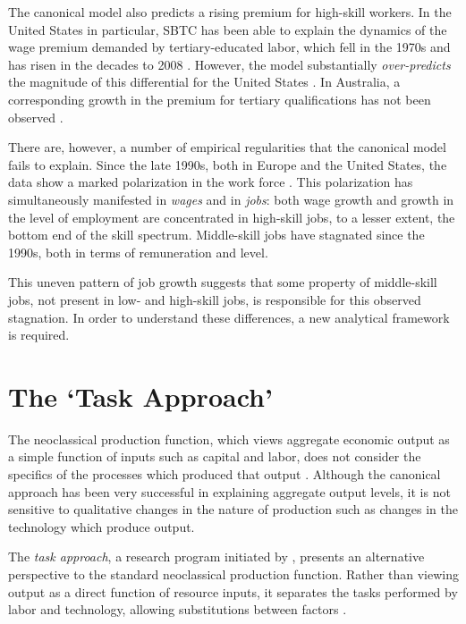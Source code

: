 The canonical model also predicts a rising premium for high-skill workers. In the United States in particular, SBTC has been able to explain the dynamics of the wage premium demanded by tertiary-educated labor, which fell in the 1970s and has risen in the decades to 2008 \citep{Acemoglu2011}. However, the model substantially \emph{over-predicts} the magnitude of this differential for the United States \citep{Autor2008}. In Australia, a corresponding growth in the premium for tertiary qualifications has not been observed \citep{Coelli2009}.

There are, however, a number of empirical regularities that the canonical model fails to explain. Since the late 1990s, both in Europe and the United States, the data show a marked polarization in the work force \citep{Goos2007, Autor2006}. This polarization has simultaneously manifested in \emph{wages} and in \emph{jobs}: both wage growth and growth in the level of employment are concentrated in high-skill jobs, to a lesser extent, the bottom end of the skill spectrum. Middle-skill jobs have stagnated since the 1990s, both in terms of remuneration and level.

This uneven pattern of job growth suggests that some property of middle-skill jobs, not present in low- and high-skill jobs, is responsible for this observed stagnation. In order to understand these differences, a new analytical framework is required.

\section{The `Task Approach'}

The neoclassical production function, which views aggregate economic output as a simple function of inputs such as capital and labor, does not consider the specifics of the processes which produced that output \citep{Acemoglu2011}. Although the canonical approach has been very successful in explaining aggregate output levels, it is not sensitive to qualitative changes in the nature of production such as changes in the technology which produce output. 


The {\em task approach}, a research program initiated by \citet{Levy2003}, presents an alternative perspective to the standard neoclassical production function. Rather than viewing output as a direct function of resource inputs, it separates the tasks performed by labor and technology, allowing  substitutions between factors \citep{Autor2013,Acemoglu2011}. 

